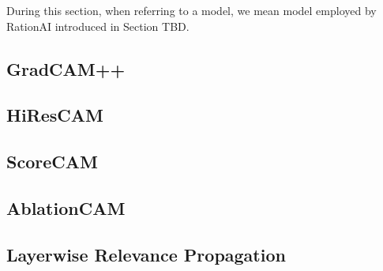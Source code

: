 During this section, when referring to a model, we mean model employed by RationAI introduced in Section TBD.


\subsection{GradCAM++}

\subsection{HiResCAM}

\subsection{ScoreCAM}

\subsection{AblationCAM}

\subsection{Layerwise Relevance Propagation}